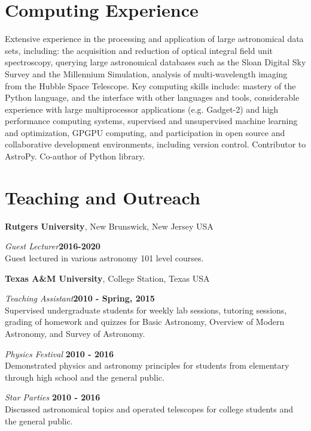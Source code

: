 \documentclass[margin,line, 11pt]{res}
\begin{document}
\begin{resume}
\section{Computing Experience}
Extensive experience in the processing and application of large astronomical data sets, including: the acquisition and reduction of optical integral field unit spectroscopy, querying large astronomical databases such as the Sloan Digital Sky Survey and the Millennium Simulation, analysis of multi-wavelength imaging from the Hubble Space Telescope. Key computing skills include: mastery of the Python language, and the interface with other languages and tools, considerable experience with large multiprocessor applications (e.g. Gadget-2) and high performance computing systems, supervised and unsupervised machine learning and optimization, GPGPU computing, and participation in open source and collaborative development environments, including version control. Contributor to {\sc AstroPy}. Co-author of \href{http://astlib.sourceforge.net/}{} Python library.
\vspace*{-3mm}

\section{Teaching and Outreach}
\textbf{Rutgers University}, New Brunswick, New Jersey USA
\vspace{-3mm}

\emph{Guest Lecturer}\hfill \textbf{2016-2020}\\
Guest lectured in various astronomy 101 level courses.

\textbf{Texas A\&M University}, College Station, Texas USA
\vspace{-3mm}

\emph{Teaching Assistant}\hfill \textbf{2010 - Spring, 2015}\\
Supervised undergraduate students for weekly lab sessions, tutoring sessions, grading of homework and quizzes for Basic Astronomy, Overview of Modern Astronomy, and Survey of Astronomy.
\vspace*{-3mm}

\emph{Physics Festival} \hfill \textbf{2010 - 2016}\\
Demonstrated physics and astronomy principles for students from elementary through high school and the general public.
\vspace*{-3mm}

\emph{Star Parties} \hfill \textbf{2010 - 2016}\\
Discussed astronomical topics and operated telescopes for college students and the general public.


\end{resume}
\end{document}
